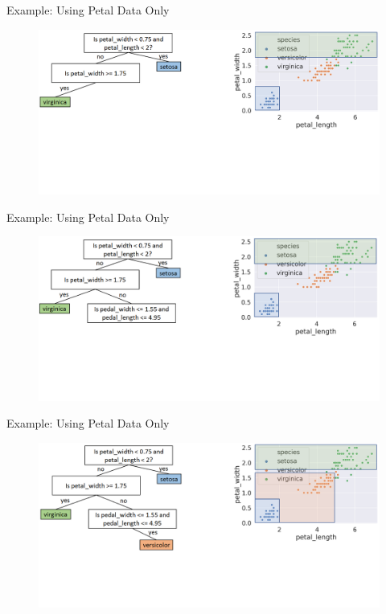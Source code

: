 \documentclass[aspectratio=169]{../latex_main/tntbeamer}  %
\begin{document}
	
	\begin{frame}{Example: Using Petal Data Only}
	    \begin{figure}
	        \includegraphics[scale=.34]{Bild9}
	    \end{figure}
	\end{frame}
	
	
	\begin{frame}{Example: Using Petal Data Only}
	    \begin{figure}
	        \includegraphics[scale=.34]{Bild10}
	    \end{figure}
	\end{frame}
	
	
	\begin{frame}{Example: Using Petal Data Only}
	    \begin{figure}
	        \includegraphics[scale=.34]{Bild11}
	    \end{figure}
	\end{frame}
	
\end{document}
